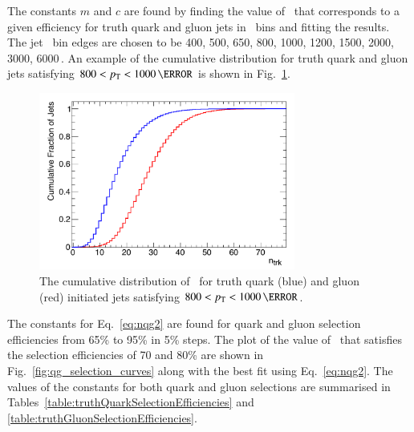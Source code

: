 The constants $m$ and $c$ are found by finding the value of \ntrk\ 
that corresponds to a given efficiency for truth quark and gluon jets in 
\pT\ bins and fitting the results. The jet \pT\ bin edges are chosen to be 
400, 500, 650, 800, 1000, 1200, 1500, 2000, 3000, 6000\,\GeV. An example of the \ntrk cumulative 
distribution for truth quark and gluon jets satisfying $800 < \pT < 1000\,\GeV$ is shown in
Fig.~\ref{fig:ntrk_cumulative}.


\begin{figure}[htb]
 \centering
\includegraphics[width=0.75\textwidth]{figures/tagging/Cumulative_ntrk_distribution_4_800_1000GeV.pdf}
\caption{The cumulative distribution of \ntrk\ for truth quark (blue) and gluon (red) initiated jets 
satisfying $800 < \pT < 1000\,\GeV$.  \label{fig:ntrk_cumulative}}
\end{figure}


The constants for Eq.~\ref{eq:nqg2} are found for quark and gluon selection efficiencies from 
65\% to 95\% in 5\% steps. The plot of the value of \ntrk\ that satisfies the selection efficiencies 
of 70 and 80\% are shown in Fig.~\ref{fig:qg_selection_curves} along with the best fit using Eq.~\ref{eq:nqg2}.
The values of the constants for both quark and gluon selections are summarised in 
Tables~\ref{table:truthQuarkSelectionEfficiencies} and \ref{table:truthGluonSelectionEfficiencies}.

